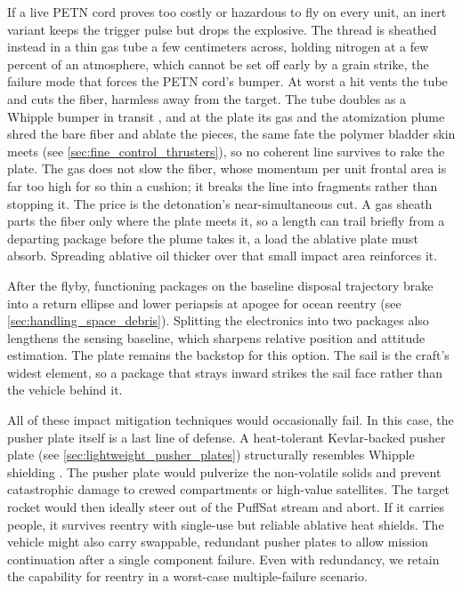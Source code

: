 \documentclass{article}
\begin{document}
If a live PETN cord proves too costly or hazardous to fly on every unit, an inert variant keeps the trigger pulse but drops the explosive. The thread is sheathed instead in a thin gas tube a few centimeters across, holding nitrogen at a few percent of an atmosphere, which cannot be set off early by a grain strike, the failure mode that forces the PETN cord's bumper. At worst a hit vents the tube and cuts the fiber, harmless away from the target. The tube doubles as a Whipple bumper in transit \cite{whipple_shield}, and at the plate its gas and the atomization plume shred the bare fiber and ablate the pieces, the same fate the polymer bladder skin meets (see \autoref{sec:fine_control_thrusters}), so no coherent line survives to rake the plate. The gas does not slow the fiber, whose momentum per unit frontal area is far too high for so thin a cushion; it breaks the line into fragments rather than stopping it. The price is the detonation's near-simultaneous cut. A gas sheath parts the fiber only where the plate meets it, so a length can trail briefly from a departing package before the plume takes it, a load the ablative plate must absorb. Spreading ablative oil thicker over that small impact area reinforces it.

After the flyby, functioning packages on the baseline disposal trajectory brake into a return ellipse and lower periapsis at apogee for ocean reentry (see \autoref{sec:handling_space_debris}). Splitting the electronics into two packages also lengthens the sensing baseline, which sharpens relative position and attitude estimation. The plate remains the backstop for this option. The sail is the craft's widest element, so a package that strays inward strikes the sail face rather than the vehicle behind it.

All of these impact mitigation techniques would occasionally fail. In this case, the pusher plate itself is a last line of defense. A heat-tolerant Kevlar-backed pusher plate (see \autoref{sec:lightweight_pusher_plates}) structurally resembles Whipple shielding \cite{whipple_shield}. The pusher plate would pulverize the non-volatile solids and prevent catastrophic damage to crewed compartments or high-value satellites. The target rocket would then ideally steer out of the PuffSat stream and abort. If it carries people, it survives reentry with single-use but reliable ablative heat shields. The vehicle might also carry swappable, redundant pusher plates to allow mission continuation after a single component failure. Even with redundancy, we retain the capability for reentry in a worst-case multiple-failure scenario.
\end{document}
